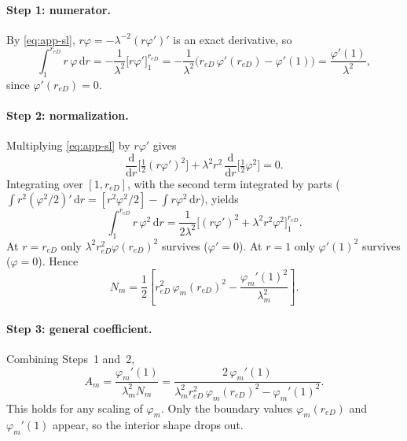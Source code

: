 \documentclass[11pt]{article}
\newcommand{\reD}{r_{eD}}
\newcommand{\dd}{\mathrm{d}}
\begin{document}
\paragraph{Step 1: numerator.}
By \eqref{eq:app-sl}, $r\varphi = -\lambda^{-2}(r\varphi')'$ is an exact derivative, so
\begin{equation}
  \int_1^{\reD} r\,\varphi\,\dd r = -\frac{1}{\lambda^2}\Big[r\varphi'\Big]_1^{\reD}
  = -\frac{1}{\lambda^2}\Big(\reD\,\varphi'(\reD) - \varphi'(1)\Big) = \frac{\varphi'(1)}{\lambda^2},
\end{equation}
since $\varphi'(\reD)=0$.

\paragraph{Step 2: normalization.}
Multiplying \eqref{eq:app-sl} by $r\varphi'$ gives
\begin{equation}
  \frac{\dd}{\dd r}\Big[\tfrac12 (r\varphi')^2\Big] + \lambda^2 r^2\,\frac{\dd}{\dd r}\Big[\tfrac12\varphi^2\Big] = 0 .
\end{equation}
Integrating over $[1,\reD]$, with the second term integrated by parts
($\int r^2(\varphi^2/2)'\,\dd r = [r^2\varphi^2/2] - \int r\varphi^2\,\dd r$), yields
\begin{equation}
  \int_1^{\reD} r\,\varphi^2\,\dd r = \frac{1}{2\lambda^2}\Big[(r\varphi')^2 + \lambda^2 r^2\varphi^2\Big]_1^{\reD}.
\end{equation}
At $r=\reD$ only $\lambda^2\reD^2\varphi(\reD)^2$ survives ($\varphi'=0$). At $r=1$ only $\varphi'(1)^2$ survives
($\varphi=0$). Hence
\begin{equation}
  N_m = \frac12\left[\reD^2\,\varphi_m(\reD)^2 - \frac{\varphi_m'(1)^2}{\lambda_m^2}\right].
\end{equation}

\paragraph{Step 3: general coefficient.}
Combining Steps~1 and~2,
\begin{equation}
  A_m = \frac{\varphi_m'(1)}{\lambda_m^2 N_m}
      = \frac{2\,\varphi_m'(1)}{\lambda_m^2\reD^2\,\varphi_m(\reD)^2 - \varphi_m'(1)^2}.
\end{equation}
This holds for any scaling of $\varphi_m$. Only the boundary values $\varphi_m(\reD)$ and $\varphi_m'(1)$ appear,
so the interior shape drops out.
\end{document}
